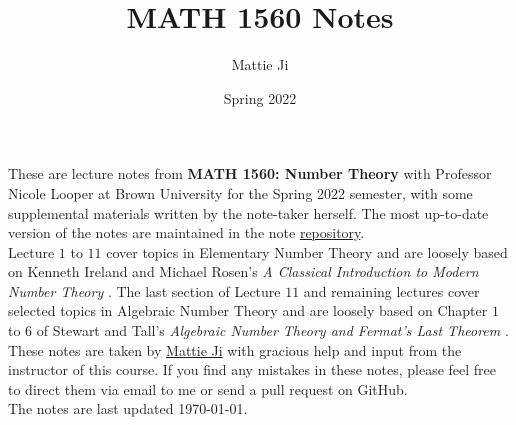\documentclass{article}
\title{MATH 1560 Notes}
\author{Mattie Ji}
\date{Spring 2022}
\begin{document}
\maketitle



\noindent These are lecture notes from \textbf{MATH 1560: Number Theory} with Professor Nicole Looper at Brown University for the Spring 2022 semester, with some supplemental materials written by the note-taker herself. The most up-to-date version of the notes are maintained in the note \href{https://github.com/maroon-scorch/MATH1560-notes}{repository}.\\

\noindent Lecture $1$ to $11$ cover topics in Elementary Number Theory and are loosely based on Kenneth Ireland and Michael Rosen's \textit{A Classical Introduction to Modern Number Theory} \cite{ireland_rosen_2011}. The last section of Lecture $11$ and remaining lectures cover selected topics in Algebraic Number Theory and are loosely based on Chapter $1$ to $6$ of Stewart and Tall's \textit{Algebraic Number Theory and Fermat's Last Theorem} \cite{stewart_tall_2020}.\\

\noindent These notes are taken by \href{https://github.com/maroon-scorch}{Mattie Ji} with gracious help and input from the instructor of this course. If you find any mistakes in these notes, please feel free to direct them via email to me or send a pull request on GitHub.\\

\noindent The notes are last updated \today.\\
\tableofcontents


\newpage

























\newpage
{}


\end{document}
